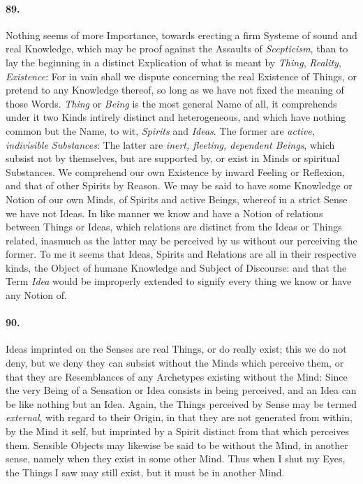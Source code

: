 \documentclass[]{article}
\newenvironment{sectionbody}{}{}
\begin{document}
\begin{sectionbody}
\paragraph{89.} Nothing seems of more Importance, towards erecting a firm Systeme
of sound and real Knowledge, which may be proof against the
Assaults of \emph{Scepticism}, than to lay the beginning in a
distinct Explication of what is meant by \emph{Thing},
\emph{Reality}, \emph{Existence}: For in vain shall we
dispute concerning the real Existence of Things, or pretend to
any Knowledge thereof, so long as we have not fixed the meaning
of those Words.  \emph{Thing} or \emph{Being} is the most
general Name of all, it comprehends under it two Kinds intirely
distinct and heterogeneous, and which have nothing common but the
Name, to wit, \emph{Spirits} and \emph{Ideas}.  The former
are \emph{active, indivisible Substances}: The latter are
\emph{inert, fleeting, dependent Beings}, which subsist not by
themselves, but are supported by, or exist in Minds or spiritual
Substances.  We comprehend our own Existence by inward Feeling or
Reflexion, and that of other Spirits by Reason.  We may be said
to have some Knowledge or Notion of our own Minds, of Spirits and
active Beings, whereof in a strict Sense we have not Ideas.  In
like manner we know and have a Notion of relations between Things
or Ideas, which relations are distinct from the Ideas or Things
related, inasmuch as the latter may be perceived by us without
our perceiving the former.  To me it seems that Ideas, Spirits
and Relations are all in their respective kinds, the Object of
humane Knowledge and Subject of Discourse: and that the Term
\emph{Idea} would be improperly extended to signify every thing
we know or have any Notion of.



\paragraph{90.} Ideas imprinted on the Senses are real Things, or do really
exist; this we do not deny, but we deny they can subsist without
the Minds which perceive them, or that they are Resemblances of
any Archetypes existing without the Mind: Since the very Being of
a Sensation or Idea consists in being perceived, and an Idea can
be like nothing but an Idea.  Again, the Things perceived by
Sense may be termed \emph{external}, with regard to their
Origin, in that they are not generated from within, by the Mind
it self, but imprinted by a Spirit distinct from that which
perceives them.  Sensible Objects may likewise be said to be
without the Mind, in another sense, namely when they exist in
some other Mind.  Thus when I shut my Eyes, the Things I saw may
still exist, but it must be in another Mind.




\end{sectionbody}
\end{document}
